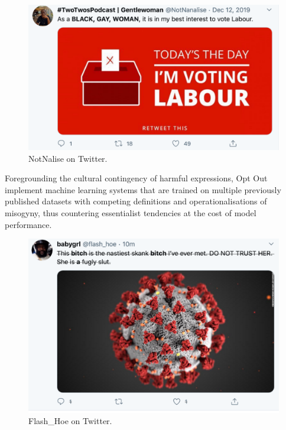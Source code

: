 \begin{figure}[h]
  \centering
  \includegraphics[scale=0.5]{Notnalise.png}
  \caption{NotNalise on Twitter.}
  \label{fig:notnalise}
\end{figure}

Foregrounding the cultural contingency of harmful expressions, Opt Out implement machine learning systems that are trained on multiple previously published datasets with competing definitions and operationalisations of misogyny, thus countering essentialist tendencies at the cost of model performance.

\begin{figure}[h]
  \centering
  \includegraphics[scale=0.5]{Rona.png}
  \caption{Flash\_Hoe on Twitter.}
  \label{fig:flash_hoe}
\end{figure}

